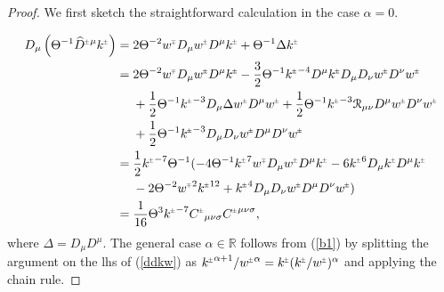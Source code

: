 \documentclass[a4paper,10pt,reqno]{amsart}
\newcommand{\cR}{\mathcal{R}}
\newcommand{\wh}{\widehat}
\newcommand{\Th}{\Theta}
\newcommand{\al}{\alpha}
\newcommand{\si}{\sigma}
\theoremstyle{plain}
\newcommand{\PM}[1]{{{#1}^{\hspace{-.5pt}\scaleto{\pm}{3.5pt}}}}
\newcommand{\MP}[1]{{{#1}^{\hspace{-.5pt}\scaleto{\mp}{3.5pt}}}}
\numberwithin{equation}{section}
\begin{document}
\begin{proof}
We  first sketch the straightforward calculation in the case $\al = 0$.


\begin{align}
\label{b1} 
D_{\mu} \left( \Th^{-1}  \PM{\wh D}{}^{\mu} \PM{k} \right) ={}& 2 \Th^{-2} \MP{w}D_{\mu} \PM{w} D^{\mu} \PM{k} + \Th^{-1} \Delta \PM{k}  \nonumber \\
={}& 2 \Th^{-2} \MP{w} D_{\mu} \PM{w} D^{\mu} \PM{k} -
 \frac{3}{2} \Th^{-1} \PM{k}^{-4} D^{\mu} \PM{k} D_{\mu} D_{\nu} \PM{w} D^{\nu} \PM{w} \nonumber \\
 & +\frac{1}{2} \Th^ {-1} \PM{k}^{-3} D_{\mu}\Delta \PM{w} D^{\mu} \PM{w} + 
 \frac{1}{2} \Theta^{-1} \PM{k}^{-3} \cR_{\mu\nu} D^{\mu} \PM{w} D^{\nu} \PM{w} \nonumber \\
 &  + \frac{1}{2} \Theta^{-1} \PM{k}^{-3}  D_{\mu}D_{\nu} \PM{w}D^{\mu} D^{\nu} \PM{w}  \nonumber \\
 ={}& \frac{1}{2} \PM{k}^{-7} \Theta^ {-1} (-4 \Theta^{-1} \PM{k}^7 \MP{w} D_{\mu} \PM{w} D^{\mu} \PM{k} - 
 6 \PM{k}^6  D_{\mu} \PM{k} D^{\mu} \PM{k}  \nonumber  \\
 &  - 2 \Theta^{-2} \MP{w}^2 \PM{k}^{12} + \PM{k}^4 D_{\mu} D_{\nu} \PM{w} D^{\mu} D^{\nu} \PM{w} ) 
  \nonumber \\
 ={}& \frac{1}{16} \Theta^3 \PM{k}^{-7} \PM{C}_{\mu\nu\si} \PM{C}^{\mu\nu\si},
 \end{align}
where $ \Delta = D_{\mu} D^{\mu}$. The general case  $\al \in \mathbb{R}$  follows  from (\ref{b1}) by splitting the argument on the lhs of (\ref{ddkw})  as  
$\PM{k}^{\al + 1} / \PM{w}^{\al} =  \PM{k} (\PM{k} / \PM{w})^{\al}$ and applying the chain rule.
\end{proof} 
\end{document}
